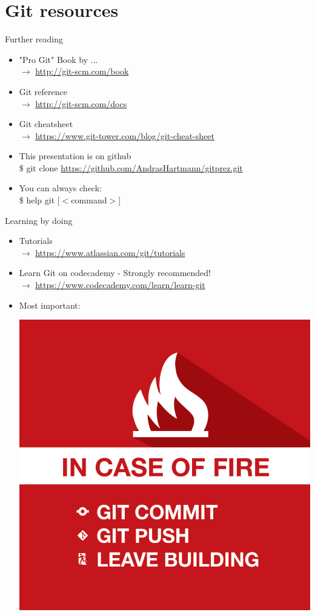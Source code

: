 \documentclass[10pt,xcolor=dvipsnames]{beamer}
\begin{document}
\section{Git resources}
\begin{frame}{Further reading}
\begin{itemize}
  \setlength\itemsep{0.2in}
\item "Pro Git" Book by ... \\$\rightarrow$  \url{http://git-scm.com/book}
\item Git reference  \\ $\rightarrow$  \url{http://git-scm.com/docs}
\item Git cheatsheet  \\ $\rightarrow$ \url{https://www.git-tower.com/blog/git-cheat-sheet}
\item This presentation is on github\\
\$ git clone \url{https://github.com/AndrasHartmann/gitprez.git}
\item You can always check:\\
 \$ help git [$<$command$>$]
\end{itemize}
\end{frame}

\begin{frame}{Learning by doing}
\begin{itemize}
  \setlength\itemsep{0.2in}
\item Tutorials  \\$\rightarrow$  \url{https://www.atlassian.com/git/tutorials}
\item Learn Git on codecademy - Strongly recommended!\\ $\rightarrow$ \url{https://www.codecademy.com/learn/learn-git}
\item Most important:
\begin{center}
\includegraphics[height=0.3\textheight]{fire-git.png}
\end{center}
\end{itemize}
\end{frame}
\end{document}

